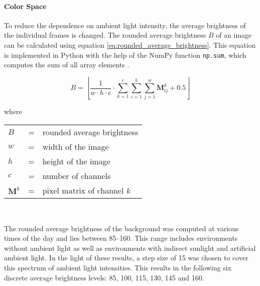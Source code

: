 \paragraph{Color Space}
To reduce the dependence on ambient light intensity, the average brightness of the individual frames is changed.
The rounded average brightness $B$ of an image can be calculated using equation \ref{eq:rounded_average_brightness}.
This equation is implemented in Python with the help of the NumPy function \texttt{np.sum}, which computes the sum of all array elements \cite{training_numpy_sum}.

\begin{equation}
  B = \left\lfloor\frac{1}{w\cdot h\cdot c} \cdot \sum\limits_{k=1}^c \sum\limits_{i=1}^h \sum\limits_{j=1}^w \boldsymbol{M}_{ij}^{k} + 0.5\right\rfloor
  \label{eq:rounded_average_brightness}
\end{equation}

where

\begin{tabular}{lll}
  $B$ & = & rounded average brightness \\
  $w$ & = & width of the image \\
  $h$ & = & height of the image \\
  $c$ & = & number of channels \\
  $\boldsymbol{M}^k$ & = & pixel matrix of channel $k$ \\
\end{tabular}
\\

\clearpage %

The rounded average brightness of the background was computed at various times of the day and lies between \numrange{85}{160}.
This range includes environments without ambient light as well as environments with indirect sunlight and artificial ambient light.
In the light of these results, a step size of \num{15} was chosen to cover this spectrum of ambient light intensities.
This results in the following six discrete average brightness levels: \num{85}, \num{100}, \num{115}, \num{130}, \num{145} and \num{160}.

